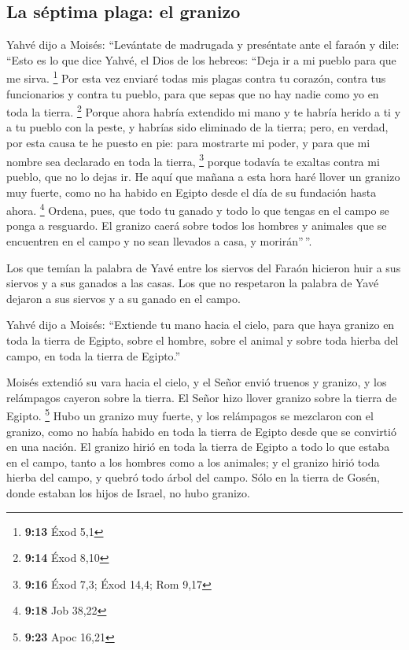 \begin{paracol}{2}
\hypertarget{la-suxe9ptima-plaga-el-granizo}{%
\subsection{La séptima plaga: el
granizo}\label{la-suxe9ptima-plaga-el-granizo}}

 Yahvé dijo a Moisés: ``Levántate de madrugada y
preséntate ante el faraón y dile: ``Esto es lo que dice Yahvé, el Dios
de los hebreos: ``Deja ir a mi pueblo para que me sirva. \footnote{\textbf{9:13}
  Éxod 5,1}  Por esta vez enviaré todas mis plagas contra
tu corazón, contra tus funcionarios y contra tu pueblo, para que sepas
que no hay nadie como yo en toda la tierra. \footnote{\textbf{9:14} Éxod
  8,10}  Porque ahora habría extendido mi mano y te
habría herido a ti y a tu pueblo con la peste, y habrías sido eliminado
de la tierra;  pero, en verdad, por esta causa te he
puesto en pie: para mostrarte mi poder, y para que mi nombre sea
declarado en toda la tierra, \footnote{\textbf{9:16} Éxod 7,3; Éxod
  14,4; Rom 9,17}  porque todavía te exaltas contra mi
pueblo, que no lo dejas ir.  He aquí que mañana a esta
hora haré llover un granizo muy fuerte, como no ha habido en Egipto
desde el día de su fundación hasta ahora. \footnote{\textbf{9:18} Job
  38,22}  Ordena, pues, que todo tu ganado y todo lo que
tengas en el campo se ponga a resguardo. El granizo caerá sobre todos
los hombres y animales que se encuentren en el campo y no sean llevados
a casa, y morirán''\,''.

 Los que temían la palabra de Yavé entre los siervos del
Faraón hicieron huir a sus siervos y a sus ganados a las casas.
 Los que no respetaron la palabra de Yavé dejaron a sus
siervos y a su ganado en el campo.

 Yahvé dijo a Moisés: ``Extiende tu mano hacia el cielo,
para que haya granizo en toda la tierra de Egipto, sobre el hombre,
sobre el animal y sobre toda hierba del campo, en toda la tierra de
Egipto.''

 Moisés extendió su vara hacia el cielo, y el Señor envió
truenos y granizo, y los relámpagos cayeron sobre la tierra. El Señor
hizo llover granizo sobre la tierra de Egipto. \footnote{\textbf{9:23}
  Apoc 16,21}  Hubo un granizo muy fuerte, y los
relámpagos se mezclaron con el granizo, como no había habido en toda la
tierra de Egipto desde que se convirtió en una nación. 
El granizo hirió en toda la tierra de Egipto a todo lo que estaba en el
campo, tanto a los hombres como a los animales; y el granizo hirió toda
hierba del campo, y quebró todo árbol del campo.  Sólo en
la tierra de Gosén, donde estaban los hijos de Israel, no hubo granizo.


\end{paracol}
